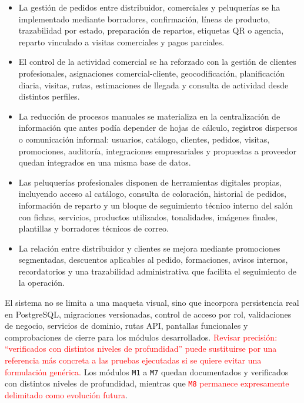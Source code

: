 \begin{itemize}
    \item La gestión de pedidos entre distribuidor, comerciales y peluquerías se ha implementado mediante borradores, confirmación, líneas de producto, trazabilidad por estado, preparación de repartos, etiquetas QR o agencia, reparto vinculado a visitas comerciales y pagos parciales.
    \item El control de la actividad comercial se ha reforzado con la gestión de clientes profesionales, asignaciones comercial-cliente, geocodificación, planificación diaria, visitas, rutas, estimaciones de llegada y consulta de actividad desde distintos perfiles.
    \item La reducción de procesos manuales se materializa en la centralización de información que antes podía depender de hojas de cálculo, registros dispersos o comunicación informal: usuarios, catálogo, clientes, pedidos, visitas, promociones, auditoría, integraciones empresariales y propuestas a proveedor quedan integrados en una misma base de datos.
    \item Las peluquerías profesionales disponen de herramientas digitales propias, incluyendo acceso al catálogo, consulta de coloración, historial de pedidos, información de reparto y un bloque de seguimiento técnico interno del salón con fichas, servicios, productos utilizados, tonalidades, imágenes finales, plantillas y borradores técnicos de correo.
    \item La relación entre distribuidor y clientes se mejora mediante promociones segmentadas, descuentos aplicables al pedido, formaciones, avisos internos, recordatorios y una trazabilidad administrativa que facilita el seguimiento de la operación.
\end{itemize}

El sistema no se limita a una maqueta visual, sino que incorpora persistencia real en PostgreSQL, migraciones versionadas, control de acceso por rol, validaciones de negocio, servicios de dominio, rutas API, pantallas funcionales y comprobaciones de cierre para los módulos desarrollados. \textcolor{red}{Revisar precisión: ``verificados con distintos niveles de profundidad'' puede sustituirse por una referencia más concreta a las pruebas ejecutadas si se quiere evitar una formulación genérica.} Los módulos \texttt{M1} a \texttt{M7} quedan documentados y verificados con distintos niveles de profundidad, mientras que \textcolor{red}{\texttt{M8} permanece expresamente delimitado como evolución futura}.

